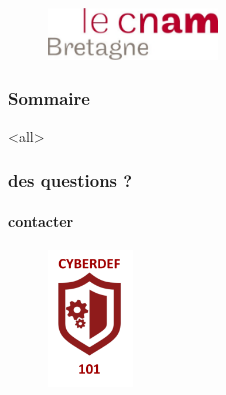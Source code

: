 \institute[\uinstituteshort]{\uinstitute \\ \uchaire}


\date[\uversion]{Date de publication\\ \today}



\begin{frame}[plain]

 					\begin{figure}
  					 \centering
   						 \includegraphics[width=0.4\textwidth]{../Tex/template.inc/Commons/CommonsPictures/cnambretagne.pdf}\\
				  \end{figure}

				  				\titlepage
\end{frame}
\begin{frame}
 \frametitle{Sommaire}
      \begin{multicols}{2}
         \tableofcontents[hideallsubsections]
     \end{multicols}
 \end{frame}

\mode<all>{\ubody}


\begin{frame}
 \frametitle{des questions ?}
  \framesubtitle{contacter \umaila}
  					\begin{figure}
  					 \centering
   						 \includegraphics[width=0.2\textwidth]{../Tex/template.inc/Commons/CommonsPictures/cyberdef101.pdf}\\
				  \end{figure}
 \end{frame}

